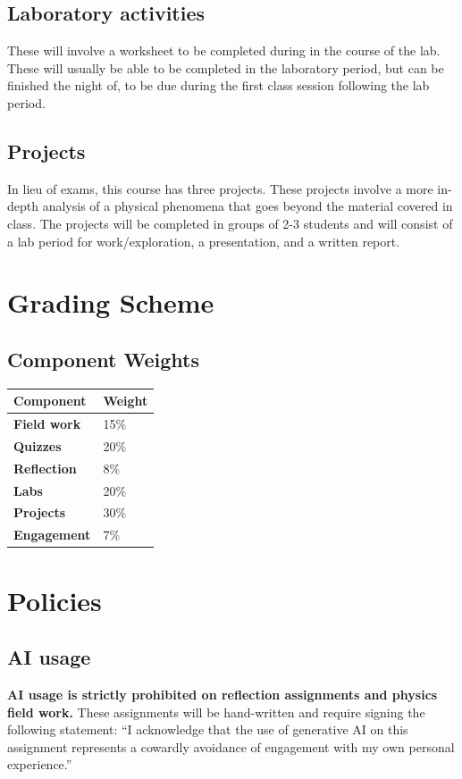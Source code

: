 \documentclass{syllabus}
\begin{document}
\subsection{Laboratory activities}
These will involve a worksheet to be completed during in the course of the lab. These will usually be able to be completed in the laboratory period, but can be finished the night of, to be due during the first class session following the lab period.

\subsection{Projects}
In lieu of exams, this course has three projects. These projects involve a more in-depth analysis of a physical phenomena that goes beyond the material covered in class. The projects will be completed in groups of 2-3 students and will consist of a lab period for work/exploration, a presentation, and a written report. 

\section*{Grading Scheme}
\subsection*{Component Weights}

\noindent\begin{tabular}{ll}
\textbf{Component} & \textbf{Weight}       \\ \hline
\textbf{Field work}             & 15\%  \\
\textbf{Quizzes}               & 20\%       \\
\textbf{Reflection}             &  8\%   \\
\textbf{Labs}                   & 20\% \\
\textbf{Projects}                  & 30\%\\
\textbf{Engagement}             &  7\%       
\end{tabular}%


\section*{Policies}
\subsection{AI usage}
\textbf{AI usage is strictly prohibited on reflection assignments and physics field work.} These assignments will be hand-written and require signing the following statement: ``I acknowledge that the use of generative AI on this assignment represents a cowardly avoidance of engagement with my own personal experience.''
\end{document}
